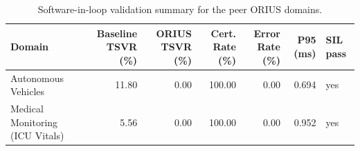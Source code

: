 \begin{table}[htbp]
\centering
\caption{Software-in-loop validation summary for the peer ORIUS domains.}
\label{tab:domain-sil-summary}
\begin{tabular}{lrrrrrl}
\toprule
Domain & Baseline TSVR (\%) & ORIUS TSVR (\%) & Cert. Rate (\%) & Error Rate (\%) & P95 (ms) & SIL pass \\
\midrule
Autonomous Vehicles & 11.80 & 0.00 & 100.00 & 0.00 & 0.694 & yes \\
Medical Monitoring (ICU Vitals) & 5.56 & 0.00 & 100.00 & 0.00 & 0.952 & yes \\
\bottomrule
\end{tabular}
\end{table}
